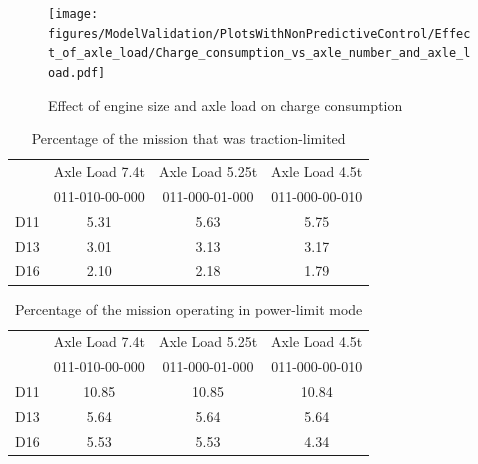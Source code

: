 \documentclass[ExampleMasters.tex]{subfiles}
\begin{document}
\begin{figure}[h!]
\centering
\texttt{[image: figures/ModelValidation/PlotsWithNonPredictiveControl/Effect\_of\_axle\_load/Charge\_consumption\_vs\_axle\_number\_and\_axle\_load.pdf]}
\caption{Effect of engine size and axle load on charge consumption}
\label{chargeEngineSizeAxleLoad}
\end{figure}

\begin{table}[h!]                                       
\centering                                              
\begin{tabular}{|c|c|c|c|}                              
\hline                                                  
 & Axle Load 7.4t & Axle Load 5.25t & Axle Load 4.5t \\
 & 011-010-00-000 & 011-000-01-000 & 011-000-00-010 \\
\hline                                                  
D11 & 5.31 & 5.63 & 5.75 \\                            
\hline                                                  
D13 & 3.01 & 3.13 & 3.17 \\ 
\hline                              
D16 & 2.10 & 2.18 & 1.79 \\                                
\hline                                                  
\end{tabular}                                           
\caption{Percentage of the mission that was traction-limited}                                
\label{table:tractionLimitMode}                              
\end{table}  

\begin{table}[h!]                                       
\centering                                              
\begin{tabular}{|c|c|c|c|}                              
\hline                                                  
 & Axle Load 7.4t & Axle Load 5.25t & Axle Load 4.5t \\
 & 011-010-00-000 & 011-000-01-000 & 011-000-00-010 \\
\hline                                                  
D11 & 10.85 & 10.85 & 10.84 \\                            
\hline                                                  
D13 & 5.64 & 5.64 & 5.64 \\ 
\hline                              
D16 & 5.53 & 5.53 & 4.34 \\                                
\hline                                                  
\end{tabular}                                           
\caption{Percentage of the mission operating in power-limit mode}                                
\label{table:powerLimitMode}                              
\end{table}  
\end{document}
